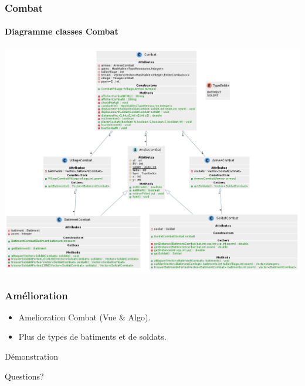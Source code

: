 \documentclass{beamer}
\begin{document}
    \begin{frame}
        \frametitle{Combat}
        \framesubtitle{Diagramme classes Combat}
        \begin{center}
            \includegraphics[scale=0.2]{images/ClassesCombat.png}
        \end{center}
    \end{frame}

    \begin{frame}
        \frametitle{Amélioration}
        \begin{itemize}
            \item Amelioration Combat (Vue \& Algo).
            \item Plus de types de batiments et de soldats.
        \end{itemize}
    \end{frame}

    \begin{frame}
        \begin{center}
           Démonstration 
        \end{center}
    \end{frame}

    \begin{frame}
        \begin{center}
            Questions?
        \end{center}
    \end{frame}
\end{document}
